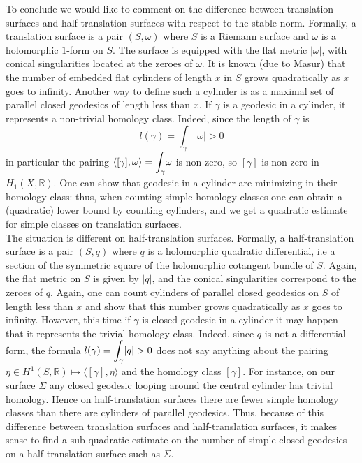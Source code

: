 \documentclass{article}
\newcommand{\RR}{\mathbb{R}}
\theoremstyle{definition}
\begin{document}
 To conclude we would like to comment on the difference between translation surfaces and half-translation surfaces with respect to the stable norm. Formally, a translation surface is a pair $(S,\omega)$ where $S$ is a Riemann surface and $\omega$ is a holomorphic $1$-form on $S$. The surface is equipped with the flat metric $| \omega |$, with conical singularities located at the zeroes of $\omega$. It is known (due to Masur) that the number of embedded flat cylinders of length $x$ in $S$ grows quadratically as $x$ goes to infinity. Another way to define such a cylinder is as a maximal set of parallel closed geodesics of length less than $x$. If $\gamma$ is a geodesic in a cylinder, it represents a non-trivial homology class. Indeed, since the length of $\gamma$ is 
 $$l(\gamma) = \int_\gamma |\omega| > 0$$
 in particular the pairing $\langle [\gamma], \omega \rangle = \mathlarger{\int}_\gamma \omega$ is non-zero, so $[\gamma]$ is non-zero in $H_1(X,\RR)$. One can show that geodesic in a cylinder are minimizing in their homology class: thus, when counting simple homology classes one can obtain a (quadratic) lower bound by counting cylinders, and we get a quadratic estimate for simple classes on translation surfaces. \\The situation is different on half-translation surfaces. Formally, a half-translation surface is a pair $(S,q)$ where $q$ is a holomorphic quadratic differential, i.e a section of the symmetric square of the holomorphic cotangent bundle of $S$. Again, the flat metric on $S$ is given by $|q|$, and the conical singularities correspond to the zeroes of $q$. Again, one can count cylinders of parallel closed geodesics on $S$ of length less than $x$ and show that this number grows quadratically as $x$ goes to infinity. However, this time if $\gamma$ is closed geodesic in a cylinder it may happen that it represents the trivial homology class. Indeed, since $q$ is not a differential form, the formula $l(\gamma) = \mathlarger{\int}_\gamma |q| > 0$ does not say anything about the pairing $ \eta \in H^1(S,\RR) \mapsto \langle [\gamma], \eta \rangle$ and the homology class $[\gamma]$. For instance, on our surface $\Sigma$ any closed geodesic looping around the central cylinder has trivial homology. Hence on half-translation surfaces there are fewer simple homology classes than there are cylinders of parallel geodesics. 
 Thus, because of this difference between translation surfaces and half-translation surfaces, it makes sense to find a sub-quadratic estimate on the number of simple closed geodesics on a half-translation surface such as $\Sigma$.
 
\end{document}
